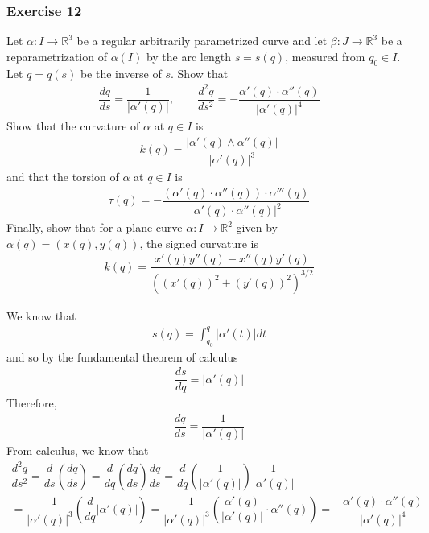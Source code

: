 \documentclass{article}
\newcommand{\R}{\mathbb{R}}
\begin{document}
	\subsubsection*{Exercise 12}
	Let $\alpha : I \to \R^3$ be a regular arbitrarily parametrized curve and let $\beta : J \to \R^3$ be a reparametrization of $\alpha(I)$ by the arc length $s = s(q)$, measured from $q_0 \in I$. Let $q = q(s)$ be the inverse of $s$. Show that
	\begin{gather*}
		\dfrac{dq}{ds} = \dfrac{1}{|\alpha'(q)|}, \qquad \dfrac{d^2q}{ds^2} = - \dfrac{\alpha'(q) \cdot \alpha''(q)}{ |\alpha'(q)|^4 }
	\end{gather*}
	Show that the curvature of $\alpha$ at $q \in I$ is
	\begin{gather*}
		k(q) = \dfrac{|\alpha'(q) \wedge \alpha''(q)|}{ |\alpha'(q)|^3 }
	\end{gather*}
	and that the torsion of $\alpha$ at $q \in I$ is
	\begin{gather*}
		\tau(q) = - \dfrac{(\alpha'(q) \cdot \alpha''(q)) \cdot \alpha'''(q)}{ |\alpha'(q) \cdot \alpha''(q)|^2 }
	\end{gather*}
	Finally, show that for a plane curve $\alpha: I \to \R^2$ given by $\alpha(q) = (x(q), y(q))$, the signed curvature is
	\begin{gather*}
		k(q) = \dfrac{x'(q) y''(q) - x''(q) y'(q)}{ \left( \left( x'(q) \right)^2 + \left( y'(q) \right)^2 \right)^{3/2} }
	\end{gather*}
	
	
	We know that
	\begin{gather*}
		s(q) = \int_{q_0}^q |\alpha'(t)|dt
	\end{gather*}
	and so by the fundamental theorem of calculus
	\begin{gather*}
		\dfrac{ds}{dq} = |\alpha'(q)|
	\end{gather*}
	Therefore,
	\begin{gather*}
		\dfrac{dq}{ds} = \dfrac{1}{|\alpha'(q)|}
	\end{gather*}
	From calculus, we know that
	\begin{gather*}
		\dfrac{d^2q}{ds^2} = \dfrac{d}{ds} \left( \dfrac{dq}{ds} \right)
		= \dfrac{d}{dq} \left( \dfrac{dq}{ds} \right) \dfrac{dq}{ds}
		= \dfrac{d}{dq} \left( \dfrac{1}{|\alpha'(q)|} \right) \dfrac{1}{|\alpha'(q)|} \\
		= \dfrac{ -1 }{ |\alpha'(q)|^3 } \left( \dfrac{d}{dq} |\alpha'(q)| \right)
		= \dfrac{ -1 }{ |\alpha'(q)|^3 } \left( \dfrac{\alpha'(q)}{|\alpha'(q)|} \cdot \alpha''(q) \right) = -\dfrac{\alpha'(q) \cdot \alpha''(q)}{ |\alpha'(q)|^4 }
	\end{gather*}
	
\end{document}
